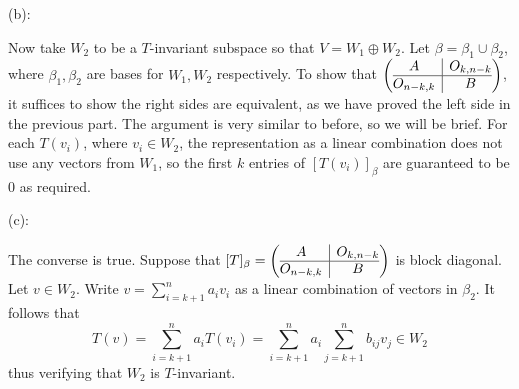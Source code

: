 \documentclass{eh-homework}
\begin{document}
\begin{question}{12}
        \medskip

        (b):

        Now take \(W_2\) to be a \(T\)-invariant subspace so that \(V = W_1 \oplus W_2\). Let \(\beta = \beta _1 \cup \beta _2\), where \(\beta _1, \beta _2\) are bases for \(W_1, W_2\) respectively. To show that \(\left(\begin{array}{@{}c|c@{}} A & O_{k,n-k} \\ \hline O_{n-k,k} & B \end{array}\right)\), it suffices to show the right sides are equivalent, as we have proved the left side in the previous part. The argument is very similar to before, so we will be brief. For each \(T(v_i)\), where \(v_i \in W_2\), the representation as a linear combination does not use any vectors from \(W_1\), so the first \(k\) entries of \([T(v_i)]_\beta\) are guaranteed to be 0 as required.

        \medskip

        (c):

        The converse is true. Suppose that \([T]_\beta = \left(\begin{array}{@{}c|c@{}} A & O_{k,n-k} \\ \hline O_{n-k,k} & B \end{array}\right)\) is block diagonal. Let \(v \in W_2\). Write \(v = \sum_{i=k+1}^{n} a_i v_i\) as a linear combination of vectors in \(\beta _2\). It follows that
        \[
            T(v) = \sum_{i=k+1}^{n} a_i T(v_i) = \sum_{i=k+1}^{n} a_i \sum_{j=k+1}^{n} b_{ij} v_j \in W_2
        \]
        thus verifying that \(W_2\) is \(T\)-invariant.
    \end{question}
    \newpage
\end{document}
